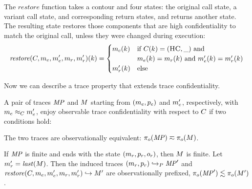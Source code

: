 \documentclass[acmsmall,review,anonymous]{acmart}\settopmatter{printfolios=true,printccs=false,printacmref=false}
\begin{document}

      The \(\mathit{restore}\) function takes a contour and four states: the
      original call state, a variant call state, and corresponding return
      states, and returns another state. The resulting state restores those
      components that are high confidentiality to match the original call,
      unless they were changed during execution:
      \[\mathit{restore}(C,m_e,m_e',m_r,m_r')
        (k) =
        \begin{cases}
          m_c(k) & \text{if } C(k) = (\textsc{HC},\_)
            \text{ and } \\
          & m_e(k) = m_r(k) \text{ and }
            m_e'(k) = m_r'(k) \\
          m_r'(k) & \text{else} \\
        \end{cases}\]

      Now we can describe a trace property that extends trace confidentiality.


      A pair of traces \(\mathit{MP}\) and \(M\) starting from
      \((m_e,p_e)\) and \(m_e'\), respectively, with
      \(m_e \approx_C m_e'\), enjoy observable trace
      confidentiality with respect to \(C\) if two conditions hold:

      The two traces are observationally equivalent: \(\pi_o(\mathit{MP}) \eqsim
      \pi_o(M)\).

      If \(\mathit{MP}\) is finite and ends with the state
      \((m_r,p_r,o_r)\), then \(M\) is finite. Let
      \(m_r' = \mathit{last}(M)\). Then the induced traces
      \((m_r,p_r) \hookrightarrow_P \mathit{MP}'\) and
      \(\mathit{restore}(C,m_e,m_e',m_r,m_r')
      \hookrightarrow M'\) are observationally prefixed,
      \(\pi_o(\mathit{MP}') \lesssim \pi_o(M')\).
\end{document}
